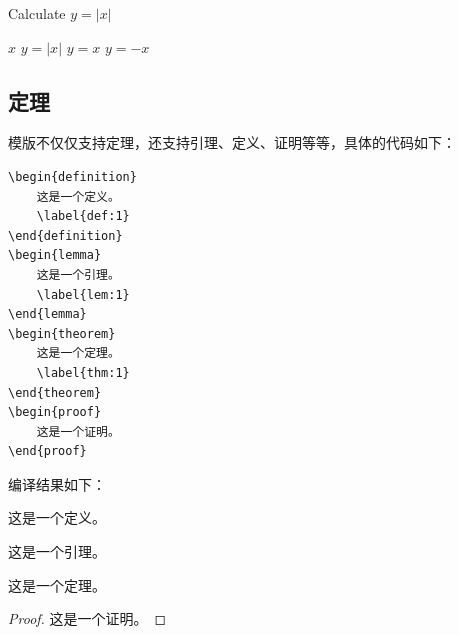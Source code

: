 \begin{algorithm} 
    \caption{Calculate $y = |x|$} 
    \label{alg:1} 
    \begin{algorithmic}
        \REQUIRE $x$ 
        \ENSURE $y = |x|$ 
        \STATE $y = x$ 
        \ELSE 
        \STATE $y = -x$
        \ENDIF
    \end{algorithmic} 
\end{algorithm}

\subsection{定理}
模版不仅仅支持定理，还支持引理、定义、证明等等，具体的代码如下：
\begin{lstlisting}
\begin{definition}
    这是一个定义。
    \label{def:1}
\end{definition}
\begin{lemma}
    这是一个引理。
    \label{lem:1}
\end{lemma}
\begin{theorem}
    这是一个定理。
    \label{thm:1}
\end{theorem}
\begin{proof}
    这是一个证明。
\end{proof}
\end{lstlisting}
编译结果如下：
\begin{shaded}
\begin{definition}
    这是一个定义。
    \label{def:1}
\end{definition}
\begin{lemma}
    这是一个引理。
    \label{lem:1}
\end{lemma}
\begin{theorem}
    这是一个定理。
    \label{thm:1}
\end{theorem}
\begin{proof}
    这是一个证明。
\end{proof}
\end{shaded}